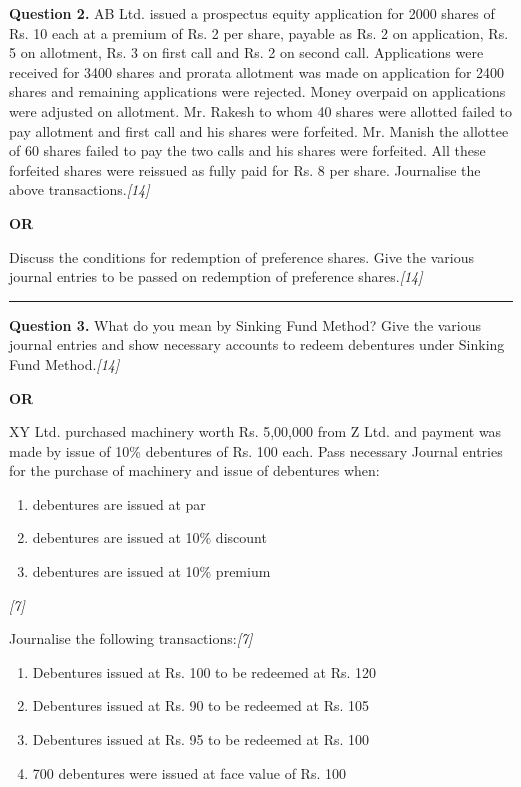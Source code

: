 \documentclass[11pt,a4paper]{article}
\newcommand{\pts}[1]{\hfill   \textit{[#1]}}
\begin{document}
\newpage




\noindent   \textbf{Question 2.}
AB Ltd. issued a prospectus equity application for 2000 shares of Rs. 10 each at a premium of Rs. 2 per share, payable as Rs. 2 on application, Rs. 5 on allotment, Rs. 3 on first call and Rs. 2 on second call. Applications were received for 3400 shares and prorata allotment was made on application for 2400 shares and remaining applications were rejected. Money overpaid on applications were adjusted on allotment. Mr. Rakesh to whom 40 shares were allotted failed to pay allotment and first call and his shares were forfeited. Mr. Manish the allottee of 60 shares failed to pay the two calls and his shares were forfeited. All these forfeited shares were reissued as fully paid for Rs. 8 per share. Journalise the above transactions.\pts{14}

\centerline{   \textbf{OR}}

Discuss the conditions for redemption of preference shares. Give the various journal entries to be passed on redemption of preference shares.\pts{14}

\medskip\rule{\linewidth}{0.2pt}




\noindent   \textbf{Question 3.}
What do you mean by Sinking Fund Method? Give the various journal entries and show necessary accounts to redeem debentures under Sinking Fund Method.\pts{14}

\centerline{   \textbf{OR}}


\begin{parts}
  \item XY Ltd. purchased machinery worth Rs. 5,00,000 from Z Ltd. and payment was made by issue of 10\% debentures of Rs. 100 each. Pass necessary Journal entries for the purchase of machinery and issue of debentures when:
  
\begin{enumerate}[label=(\roman*),itemsep=2pt]
    \item debentures are issued at par
    \item debentures are issued at 10\% discount
    \item debentures are issued at 10\% premium
  \end{enumerate}\pts{7}
  \item Journalise the following transactions:\pts{7}
  
\begin{enumerate}[label=(\roman*),itemsep=2pt]
    \item Debentures issued at Rs. 100 to be redeemed at Rs. 120
    \item Debentures issued at Rs. 90 to be redeemed at Rs. 105
    \item Debentures issued at Rs. 95 to be redeemed at Rs. 100
    \item 700 debentures were issued at face value of Rs. 100
  \end{enumerate}
\end{parts}
\end{document}
